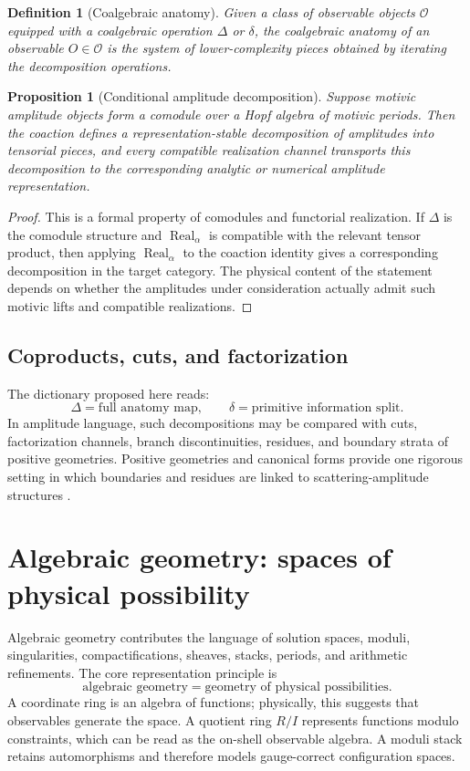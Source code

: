 \documentclass[11pt]{article}
\newtheorem{definition}{Definition}[section]
\newtheorem{proposition}{Proposition}[section]
\newcommand{\Real}{\operatorname{Real}}
\begin{document}
\begin{definition}[Coalgebraic anatomy]
Given a class of observable objects $\mathcal O$ equipped with a coalgebraic operation $\Delta$ or $\delta$, the \emph{coalgebraic anatomy} of an observable $O\in\mathcal O$ is the system of lower-complexity pieces obtained by iterating the decomposition operations.
\end{definition}

\begin{proposition}[Conditional amplitude decomposition]
Suppose motivic amplitude objects form a comodule over a Hopf algebra of motivic periods. Then the coaction defines a representation-stable decomposition of amplitudes into tensorial pieces, and every compatible realization channel transports this decomposition to the corresponding analytic or numerical amplitude representation.
\end{proposition}

\begin{proof}
This is a formal property of comodules and functorial realization. If $\Delta$ is the comodule structure and $\Real_\alpha$ is compatible with the relevant tensor product, then applying $\Real_\alpha$ to the coaction identity gives a corresponding decomposition in the target category. The physical content of the statement depends on whether the amplitudes under consideration actually admit such motivic lifts and compatible realizations.
\end{proof}

\subsection{Coproducts, cuts, and factorization}

The dictionary proposed here reads:
\[
\Delta=\text{full anatomy map},\qquad
\delta=\text{primitive information split}.
\]
In amplitude language, such decompositions may be compared with cuts, factorization channels, branch discontinuities, residues, and boundary strata of positive geometries. Positive geometries and canonical forms provide one rigorous setting in which boundaries and residues are linked to scattering-amplitude structures \cite{ArkaniHamedBaiLam2017}.

\section{Algebraic geometry: spaces of physical possibility}

Algebraic geometry contributes the language of solution spaces, moduli, singularities, compactifications, sheaves, stacks, periods, and arithmetic refinements. The core representation principle is
\[
\boxed{\text{algebraic geometry}=\text{geometry of physical possibilities}.}
\]
A coordinate ring is an algebra of functions; physically, this suggests that observables generate the space. A quotient ring $R/I$ represents functions modulo constraints, which can be read as the on-shell observable algebra. A moduli stack retains automorphisms and therefore models gauge-correct configuration spaces.
\end{document}

